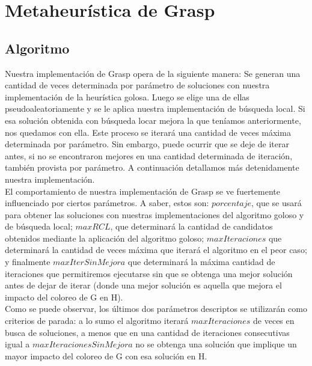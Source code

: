 \section{Metaheurística de Grasp}

\subsection{Algoritmo}

\indent Nuestra implementación de Grasp opera de la siguiente manera: Se generan una cantidad de veces determinada por parámetro de soluciones con nuestra implementación de la heurística golosa. Luego se elige una de ellas pseudoaleatoriamente y se le aplica nuestra implementación de búsqueda local. Si esa solución obtenida con búsqueda locar mejora la que teníamos anteriormente, nos quedamos con ella. Este proceso se iterará una cantidad de veces máxima determinada por parámetro. Sin embargo, puede ocurrir que se deje de iterar antes, si no se encontraron mejores en una cantidad determinada de iteración, también provista por parámetro. A continuación detallamos más detenidamente nuestra implementación.\\

\indent El comportamiento de nuestra implementación de Grasp se ve fuertemente influenciado por ciertos parámetros. A saber, estos son: $porcentaje$, que se usará para obtener las soluciones con nuestras implementaciones del algoritmo goloso y de búsqueda local; $maxRCL$, que determinará la cantidad de candidatos obtenidos mediante la aplicación del algoritmo goloso; $maxIteraciones$ que determinará la cantidad de veces máxima que iterará el algoritmo en el peor caso; y finalmente $maxIterSinMejora$ que determinará la máxima cantidad de iteraciones que permitiremos ejecutarse sin que se obtenga una mejor solución antes de dejar de iterar (donde una mejor solución es aquella que mejora el impacto del coloreo de G en H). \\
\indent Como se puede observar, los últimos dos parámetros descriptos se utilizarán como criterios de parada: a lo sumo el algoritmo iterará $maxIteraciones$ de veces en busca de soluciones, a menos que en una cantidad de iteraciones consecutivas igual a $maxIteracionesSinMejora$ no se obtenga una solución que implique un mayor impacto del coloreo de G con esa solución en H.\\

